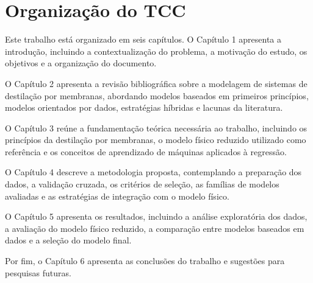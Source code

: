 \section{Organização do TCC}

Este trabalho está organizado em seis capítulos. O Capítulo 1 apresenta a introdução, incluindo a contextualização do problema, a motivação do estudo, os objetivos e a organização do documento.

O Capítulo 2 apresenta a revisão bibliográfica sobre a modelagem de sistemas de destilação por membranas, abordando modelos baseados em primeiros princípios, modelos orientados por dados, estratégias híbridas e lacunas da literatura.

O Capítulo 3 reúne a fundamentação teórica necessária ao trabalho, incluindo os princípios da destilação por membranas, o modelo físico reduzido utilizado como referência e os conceitos de aprendizado de máquinas aplicados à regressão.

O Capítulo 4 descreve a metodologia proposta, contemplando a preparação dos dados, a validação cruzada, os critérios de seleção, as famílias de modelos avaliadas e as estratégias de integração com o modelo físico.

O Capítulo 5 apresenta os resultados, incluindo a análise exploratória dos dados, a avaliação do modelo físico reduzido, a comparação entre modelos baseados em dados e a seleção do modelo final.

Por fim, o Capítulo 6 apresenta as conclusões do trabalho e sugestões para pesquisas futuras.